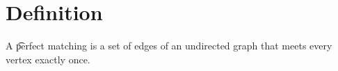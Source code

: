 
\section*{Definition}

A \t{perfect matching} is a set of edges of an undirected graph that meets every vertex exactly once.

\blankpage